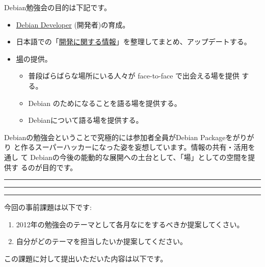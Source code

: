\documentclass[mingoth,a4paper]{jsarticle}
\begin{document}
 Debian勉強会の目的は下記です。

 \begin{itemize}
 \item \underline{Debian Developer} (開発者)の育成。
 \item 日本語での「\underline{開発に関する情報}」を整理してまとめ、アップデートする。
 \item \underline{場}の提供。
 \begin{itemize}
  \item 普段ばらばらな場所にいる人々が face-to-face で出会える場を提供
	する。
  \item Debian のためになることを語る場を提供する。
  \item Debianについて語る場を提供する。
 \end{itemize}
 \end{itemize}		

 Debianの勉強会ということで究極的には参加者全員がDebian Packageをがりがり
 と作るスーパーハッカーになった姿を妄想しています。情報の共有・活用を通し
 て Debianの今後の能動的な展開への土台として、「場」としての空間を提供す
 るのが目的です。


\newpage

\begin{minipage}[b]{0.2\hsize}
 \colorbox{titleback}{}
\end{minipage}
\begin{minipage}[b]{0.8\hsize}
\hrule
\vspace{2mm}
\hrule
\begin{multicols}{2}
\tableofcontents
\end{multicols}
\vspace{2mm}
\hrule
\end{minipage}


今回の事前課題は以下です:
\begin{enumerate}
 \item 2012年の勉強会のテーマとして各月なにをするべきか提案してくさい。 
 \item 自分がどのテーマを担当したいか提案してください。
\end{enumerate}
この課題に対して提出いただいた内容は以下です。
\begin{multicols}{2}
{\small
 
}
\end{multicols}

\end{document}
